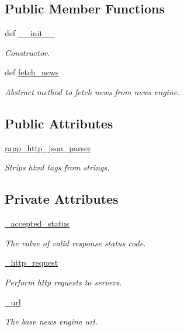 \subsection*{Public Member Functions}
\begin{DoxyCompactItemize}
\item 
def \hyperlink{classrapp__news__explorer_1_1news__engine__base_1_1NewsEngineBase_a1fda6376fa5d76de79dbf8f5b44438f9}{\-\_\-\-\_\-init\-\_\-\-\_\-}
\begin{DoxyCompactList}\small\item\em Constructor. \end{DoxyCompactList}\item 
def \hyperlink{classrapp__news__explorer_1_1news__engine__base_1_1NewsEngineBase_af14098e2dc744cd4f55e50e98e808623}{fetch\-\_\-news}
\begin{DoxyCompactList}\small\item\em Abstract method to fetch news from news engine. \end{DoxyCompactList}\end{DoxyCompactItemize}
\subsection*{Public Attributes}
\begin{DoxyCompactItemize}
\item 
\hyperlink{classrapp__news__explorer_1_1news__engine__base_1_1NewsEngineBase_ad1fe3e8243ed542c6daae881a67bdd46}{rapp\-\_\-http\-\_\-json\-\_\-parser}
\begin{DoxyCompactList}\small\item\em Strips html tags from strings. \end{DoxyCompactList}\end{DoxyCompactItemize}
\subsection*{Private Attributes}
\begin{DoxyCompactItemize}
\item 
\hyperlink{classrapp__news__explorer_1_1news__engine__base_1_1NewsEngineBase_a121744fe761da152f89c91af07e1d0c8}{\-\_\-accepted\-\_\-status}
\begin{DoxyCompactList}\small\item\em The value of valid response status code. \end{DoxyCompactList}\item 
\hyperlink{classrapp__news__explorer_1_1news__engine__base_1_1NewsEngineBase_ae4f2553c61a306faa2ac59ccbe1159b5}{\-\_\-http\-\_\-request}
\begin{DoxyCompactList}\small\item\em Perform http requests to servers. \end{DoxyCompactList}\item 
\hyperlink{classrapp__news__explorer_1_1news__engine__base_1_1NewsEngineBase_af60c108531498c4b24469f00d5c2c84e}{\-\_\-url}
\begin{DoxyCompactList}\small\item\em The base news engine url. \end{DoxyCompactList}\end{DoxyCompactItemize}
